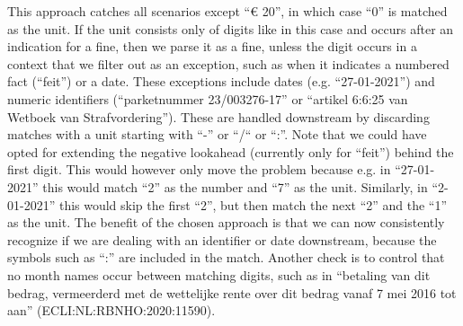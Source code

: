 \documentclass[a4paper]{article}
\begin{document}
This approach catches all scenarios except ``€ 20'', in which case ``0'' is matched as the unit.
If the unit consists only of digits like in this case and occurs after an indication for a fine, then we parse it as a fine, unless the digit occurs in a context that we filter out as an exception, such as when it indicates a numbered fact (``feit'') or a date.
These exceptions include dates (e.g. ``27-01-2021'') and numeric identifiers (``parketnummer 23/003276-17'' or ``artikel 6:6:25 van Wetboek van Strafvordering'').
These are handled downstream by discarding matches with a unit starting with ``-'' or ``/`` or ``:''.
Note that we could have opted for extending the negative lookahead (currently only for ``feit'') behind the first digit.
This would however only move the problem because e.g. in ``27-01-2021'' this would match ``2'' as the number and ``7'' as the unit. 
Similarly, in ``2-01-2021'' this would skip the first ``2'', but then match the next ``2'' and the ``1'' as the unit.
The benefit of the chosen approach is that we can now consistently recognize if we are dealing with an identifier or date downstream, because the symbols such as ``:'' are included in the match.
Another check is to control that no month names occur between matching digits, such as in ``betaling van dit bedrag, vermeerderd met de wettelijke rente over dit bedrag vanaf 7 mei 2016 tot aan'' (ECLI:NL:RBNHO:2020:11590).
\end{document}
